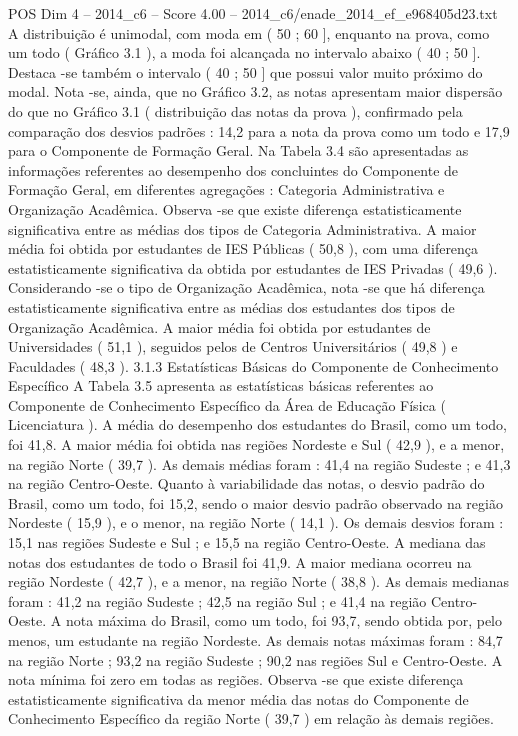\begin{textsample}{POS Dim 4 – 2014\_c6 – Score 4.00 – 2014\_c6/enade\_2014\_ef\_e968405d23.txt}
A distribuição é unimodal, com moda em ( 50 ; 60 ], enquanto na prova, como um todo ( Gráfico 3.1 ), a moda foi alcançada no intervalo abaixo ( 40 ; 50 ].
Destaca -se também o intervalo ( 40 ; 50 ] que possui valor muito próximo do modal.
Nota -se, ainda, que no Gráfico 3.2, as notas apresentam maior dispersão do que no Gráfico 3.1 ( distribuição das notas da prova ), confirmado pela comparação dos desvios padrões : 14,2 para a nota da prova como um todo e 17,9 para o Componente de Formação Geral.
Na Tabela 3.4 são apresentadas as informações referentes ao desempenho dos concluintes do Componente de Formação Geral, em diferentes agregações : Categoria Administrativa e Organização Acadêmica.
Observa -se que existe diferença estatisticamente significativa entre as médias dos tipos de Categoria Administrativa.
A maior média foi obtida por estudantes de IES Públicas ( 50,8 ), com uma diferença estatisticamente significativa da obtida por estudantes de IES Privadas ( 49,6 ).
Considerando -se o tipo de Organização Acadêmica, nota -se que há diferença estatisticamente significativa entre as médias dos estudantes dos tipos de Organização Acadêmica.
A maior média foi obtida por estudantes de Universidades ( 51,1 ), seguidos pelos de Centros Universitários ( 49,8 ) e Faculdades ( 48,3 ). 3.1.3 Estatísticas Básicas do Componente de Conhecimento Específico A Tabela 3.5 apresenta as estatísticas básicas referentes ao Componente de Conhecimento Específico da Área de Educação Física ( Licenciatura ).
A média do desempenho dos estudantes do Brasil, como um todo, foi 41,8.
A maior média foi obtida nas regiões Nordeste e Sul ( 42,9 ), e a menor, na região Norte ( 39,7 ).
As demais médias foram : 41,4 na região Sudeste ; e 41,3 na região Centro-Oeste.
Quanto à variabilidade das notas, o desvio padrão do Brasil, como um todo, foi 15,2, sendo o maior desvio padrão observado na região Nordeste ( 15,9 ), e o menor, na região Norte ( 14,1 ).
Os demais desvios foram : 15,1 nas regiões Sudeste e Sul ; e 15,5 na região Centro-Oeste.
A mediana das notas dos estudantes de todo o Brasil foi 41,9.
A maior mediana ocorreu na região Nordeste ( 42,7 ), e a menor, na região Norte ( 38,8 ).
As demais medianas foram : 41,2 na região Sudeste ; 42,5 na região Sul ; e 41,4 na região Centro-Oeste.
A nota máxima do Brasil, como um todo, foi 93,7, sendo obtida por, pelo menos, um estudante na região Nordeste.
As demais notas máximas foram : 84,7 na região Norte ; 93,2 na região Sudeste ; 90,2 nas regiões Sul e Centro-Oeste.
A nota mínima foi zero em todas as regiões.
Observa -se que existe diferença estatisticamente significativa da menor média das notas do Componente de Conhecimento Específico da região Norte ( 39,7 ) em relação às demais regiões.

\end{textsample}

